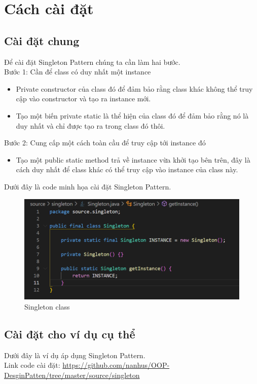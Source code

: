 \section{Cách cài đặt}
\subsection{Cài đặt chung}
Để cài đặt Singleton Pattern chúng ta cần làm hai bước.\\
Bước 1: Cần để class có duy nhất một instance
\begin{itemize}
    \item Private constructor của class đó để đảm bảo rằng class khác không thể truy cập vào constructor và tạo ra instance mới.
    \item Tạo một biến private static là thể hiện của class đó để đảm bảo rằng nó là duy nhất và chỉ được tạo ra trong class đó thôi.
\end{itemize}
Bước 2: Cung cấp một cách toàn cầu để truy cập tới instance đó
\begin{itemize}
    \item Tạo một public static method trả về instance vừa khởi tạo bên trên, đây là cách duy nhất để class khác có thể truy cập vào instance của class này.
\end{itemize}

Dưới đây là code minh họa cài đặt Singleton Pattern.\\

\begin{figure}[!htb]
    \centering
    \includegraphics[width=\textwidth]
    {fig/Singleton/singleton_class.png}
    \caption{Singleton class}
    \label{fig:Singleton Class}
\end{figure}

\subsection{Cài đặt cho ví dụ cụ thể}
Dưới đây là ví dụ áp dụng Singleton Pattern.\\
Link code cài đặt:
\url{https://github.com/nanhus/OOP-DesginPatten/tree/master/source/singleton}

